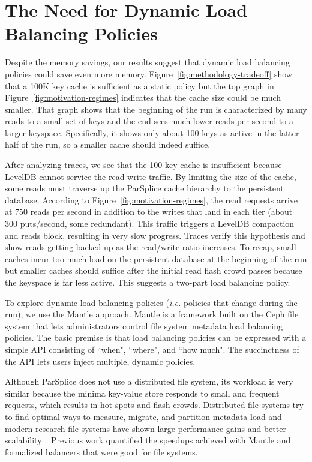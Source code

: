 \section{The Need for Dynamic Load Balancing Policies}
\label{sec:the-need-for-dynamic-load-balancing-policies}

Despite the memory savings, our results suggest that dynamic load balancing
policies could save even more memory.  Figure~\ref{fig:methodology-tradeoff}
show that a 100K key cache is sufficient as a static policy but the top graph
in Figure~\ref{fig:motivation-regimes} indicates that the cache size could be
much smaller. That graph shows that the beginning of the run is characterized
by many reads to a small set of keys and the end sees much lower reads per
second to a larger keyspace. Specifically, it shows only about 100 keys as
active in the latter half of the run, so a smaller cache should indeed suffice. 

After analyzing traces, we see that the 100 key cache is insufficient because
LevelDB cannot service the read-write traffic. By limiting the size of the
cache, some reads must traverse up the ParSplice cache hierarchy to the
persistent database.  According to Figure~\ref{fig:motivation-regimes}, the
read requests arrive at 750 reads per second in addition to the writes that
land in each tier (about 300 puts/second, some redundant). This traffic
triggers a LevelDB compaction and reads block, resulting in very slow progress.
Traces verify this hypothesis and show reads getting backed up as the
read/write ratio increases. To recap, small caches incur too much load on the
persistent database  at the beginning of the run but smaller caches should
suffice after the initial read flash crowd passes because the keyspace is far
less active. This suggests a two-part load balancing policy.

To explore dynamic load balancing policies ({\it i.e.} policies that change
during the run), we use the Mantle approach.  Mantle is a framework built on the
Ceph file system that lets administrators control file system metadata load
balancing policies. The basic premise is that load balancing policies can be
expressed with a simple API consisting of ``when", ``where", and ``how much".
The succinctness of the API lets users inject multiple, dynamic policies.

Although ParSplice does not use a distributed file system, its workload is very
similar because the minima key-value store responds to small and frequent
requests, which results in hot spots and flash crowds.  Distributed file
systems try to find optimal ways to measure, migrate, and partition metadata
load and modern research file systems have shown large performance gains and
better scalability~\cite{zheng:pdsw2014-batchfs, zheng:pdsw2015-deltafs,
grider:pdsw2015-marfs, ren:sc2014-indexfs, patil:fast2011-giga+,
brandt:msst2003-lh}.  Previous work quantified the speedups achieved with
Mantle and formalized balancers that were good for file systems.

